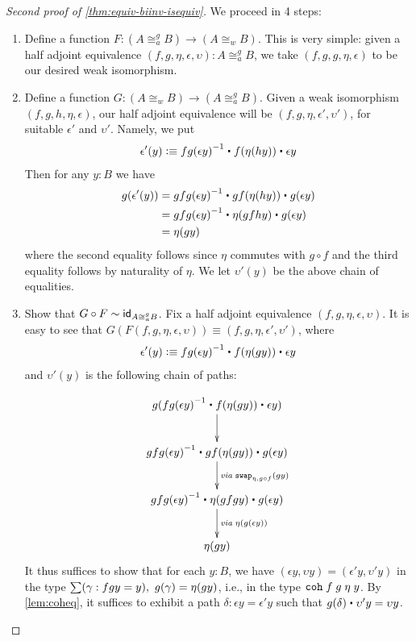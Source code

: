\begin{proof}[Second proof of \autoref{thm:equiv-biinv-isequiv}]
We proceed in 4 steps:
\begin{enumerate}
\item Define a function $F : (A \cong^g_a B) \to (A \cong_w B)$. This is very simple: given a half adjoint equivalence $(f,g,\eta,\epsilon,\upsilon) : A \cong^g_a B$, 
we take $(f,g,g,\eta,\epsilon)$ to be our desired weak isomorphism.



\item Define a function $G : (A \cong_w B) \to (A \cong^g_a B)$. Given a weak isomorphism $(f,g,h,\eta,\epsilon)$, our half adjoint equivalence will be $(f,g,\eta,\epsilon',\upsilon')$, for suitable $\epsilon'$ and $\upsilon'$. 
Namely, we put
\begin{align*}
\epsilon'(y) \defeq \opp{fg(\epsilon y)} \ct f(\eta (h y)) \ct \epsilon y
\end{align*}
Then for any $y : B$ we have
\begin{align*}
g(\epsilon'(y)) & = \opp{gfg(\epsilon y)} \ct gf(\eta (h y)) \ct g(\epsilon y) \\
& = \opp{gfg(\epsilon y)} \ct \eta (gfhy) \ct g(\epsilon y) \\
& = \eta(gy)
\end{align*}
where the second equality follows since $\eta$ commutes with $g \circ f$ and the third equality follows by naturality of $\eta$. We let $\upsilon'(y)$ be the above chain of equalities.



\item Show that $G \circ F \sim \idfunc[A \cong^g_a B]$. Fix a half adjoint equivalence $(f,g,\eta,\epsilon,\upsilon)$. It is easy to see that $G(F(f,g,\eta,\epsilon,\upsilon)) \equiv (f,g,\eta, \epsilon', \upsilon')$, where
\begin{align*}
\epsilon'(y) \defeq \opp{fg(\epsilon y)} \ct f(\eta (g y)) \ct \epsilon y
\end{align*}
and $\upsilon'(y)$ is the following chain of paths:

\begin{align*}
\xymatrix{
g(\opp{fg(\epsilon y)} \ct f(\eta (g y)) \ct \epsilon y) \ar[d] \\
\opp{gfg(\epsilon y)} \ct gf(\eta (g y)) \ct g(\epsilon y) \ar[d]^{\mathit{via\;}\com{\eta}{g\circ f}{gy}} \\
\opp{gfg(\epsilon y)} \ct \eta (gfgy) \ct g(\epsilon y) \ar[d]^{\mathit{via \;} \eta(g(\epsilon y))} \\
\eta(g y)}
\end{align*}
It thus suffices to show that for each $y : B$, we have $(\epsilon y,\upsilon y) = (\epsilon' y,\upsilon' y)$ in the type $\sm{\gamma : fgy = y} g(\gamma) = \eta(g y)$, i.e., in the type $\coh{f}{g}{\eta} \; y$. By \autoref{lem:coheq}, it suffices to exhibit a path $\delta : \epsilon y = \epsilon' y$ such that $g(\delta) \ct \upsilon' y = \upsilon y$.


\end{enumerate}
\end{proof}
